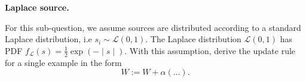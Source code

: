 \item {} \textbf{Laplace source.}

For this sub-question, we assume sources are distributed according to a standard Laplace distribution, i.e $s_i \sim \mathcal{L}(0,1)$. The Laplace distribution $\mathcal{L}(0,1)$ has PDF $f_{\mathcal{L}}(s) = \frac{1}{2}\exp\left(-\mid s\mid \right)$. With this assumption, derive the update rule for a single example in the form
$$ W := W + \alpha \left(\ldots\right).$$

